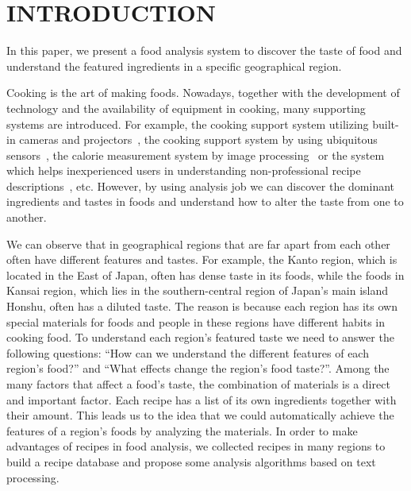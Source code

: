 \documentclass{sig-alternate}
\begin{document}
\section{INTRODUCTION}
In this paper, we present a food analysis system to discover the taste of food and understand the featured ingredients in a specific geographical region.
\par Cooking is the art of making foods. Nowadays, together with the development of technology and the availability of equipment in cooking, many supporting systems are introduced. For example, the cooking support system utilizing built-in cameras and projectors~\cite{morioka:camera-projecter}, the cooking support system by using ubiquitous sensors~\cite{nakauchi:recog}, the calorie measurement system by image processing~\cite{villalobos:image-calorie} or the system which helps inexperienced users in understanding non-professional recipe descriptions~\cite{ide:inexper}, etc. However, by using analysis job we can discover the dominant ingredients and tastes in foods and understand how to alter the taste from one to another.
\par We can observe that in geographical regions that are far apart from each other often have different features and tastes. For example, the Kanto region, which is located in the East of Japan, often has dense taste in its foods, while the foods in Kansai region, which lies in the southern-central region of Japan's main island Honshu, often has a diluted taste. The reason is because each region has its own special materials for foods and people in these regions have different habits in cooking food. To understand each region's featured taste we need to answer the following questions: ``How can we understand the different features of each region's food?'' and ``What effects change the region's food taste?''. Among the many factors that affect a food's taste, the combination of materials is a direct and important factor. Each recipe has a list of its own ingredients together with their amount. This leads us to the idea that we could automatically achieve the features of a region's foods by analyzing the materials. In order to make advantages of recipes in food analysis, we collected recipes in many regions to build a recipe database and propose some analysis algorithms based on text processing.
\end{document}
